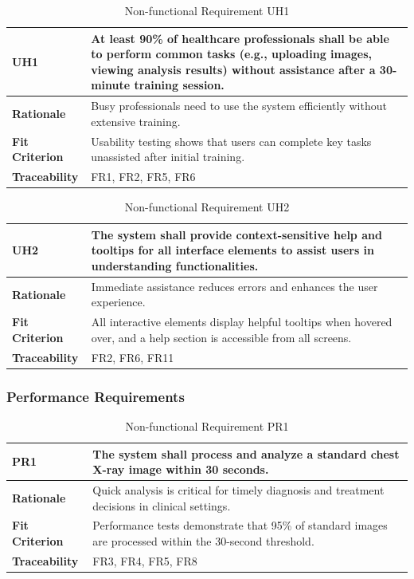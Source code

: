 \documentclass[12pt]{article}
\begin{document}
\begin{table}[h!]
\centering
{}
\begin{tabular}{|p{3.5cm}|p{11.5cm}|}
\hline
\rowcolor{gray!30}
\textbf{UH1} & At least 90\% of healthcare professionals shall be able to perform common tasks (e.g., uploading images, viewing analysis results) without assistance after a 30-minute training session. \\
\hline
\textbf{Rationale} & Busy professionals need to use the system efficiently without extensive training. \\
\hline
\textbf{Fit Criterion} & Usability testing shows that users can complete key tasks unassisted after initial training. \\
\hline
\textbf{Traceability} & FR1, FR2, FR5, FR6 \\
\hline
\end{tabular}
\caption{Non-functional Requirement UH1}
\end{table}

\begin{table}[h!]
\centering
{}
\begin{tabular}{|p{3.5cm}|p{11.5cm}|}
\hline
\rowcolor{gray!30}
\textbf{UH2} & The system shall provide context-sensitive help and tooltips for all interface elements to assist users in understanding functionalities. \\
\hline
\textbf{Rationale} & Immediate assistance reduces errors and enhances the user experience. \\
\hline
\textbf{Fit Criterion} & All interactive elements display helpful tooltips when hovered over, and a help section is accessible from all screens. \\
\hline
\textbf{Traceability} & FR2, FR6, FR11 \\
\hline
\end{tabular}
\caption{Non-functional Requirement UH2}
\end{table}

\subsubsection{Performance Requirements}

\begin{table}[h!]
\centering
{}
\begin{tabular}{|p{3.5cm}|p{11.5cm}|}
\hline
\rowcolor{gray!30}
\textbf{PR1} & The system shall process and analyze a standard chest X-ray image within 30 seconds. \\
\hline
\textbf{Rationale} & Quick analysis is critical for timely diagnosis and treatment decisions in clinical settings. \\
\hline
\textbf{Fit Criterion} & Performance tests demonstrate that 95\% of standard images are processed within the 30-second threshold. \\
\hline
\textbf{Traceability} & FR3, FR4, FR5, FR8 \\
\hline
\end{tabular}
\caption{Non-functional Requirement PR1}
\end{table}
\end{document}
